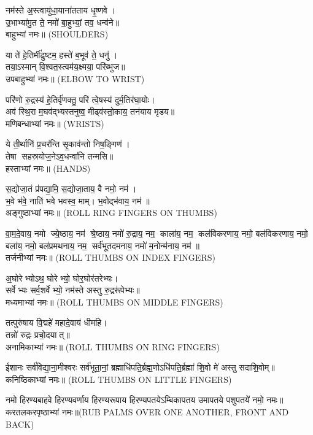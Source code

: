 नम॑स्ते अ॒स्त्वायु॑धा॒याना॑तताय धृ॒ष्णवे।\\
 उ॒भाभ्या॑मु॒त ते॒ नमो॑ बा॒हुभ्यां॒ तव॒ धन्व॑ने॥\\
बाहुभ्यां नमः॥ {\scriptsize (SHOULDERS)}


 या ते॑ हे॒तिर्मी॑ढुष्टम॒ हस्ते॑ ब॒भूव॑ ते॒ धनु॑।\\
 तया॒ऽस्मान् वि॒श्वत॒स्त्वम॑य॒क्ष्मया॒ परि॑ब्भुज॥\\
उपबाहुभ्यां नमः॥ {\scriptsize (ELBOW TO WRIST)}

परि॑णो रु॒द्रस्य॑ हे॒तिर्वृ॑णक्तु॒ परि॑ त्वे॒षस्य॑ दुर्म॒तिर॑घा॒योः।\\
 अव॑ स्थि॒रा म॒घव॑द्भ्यस्तनुष्व॒ मीढ्व॑स्तो॒काय॒ तन॑याय मृडय॥\\
मणिबन्धाभ्यां नमः॥ {\scriptsize (WRISTS)}

 ये ती॒र्थानि॑ प्र॒चर॑न्ति सृ॒काव॑न्तो निष॒ङ्गिण॑।\\
 तेषा सहस्रयोज॒नेऽव॒धन्वा॑नि तन्मसि॥\\
हस्ताभ्यां नमः॥ {\scriptsize (HANDS)}


स॒द्योजा॒तं प्र॑पद्या॒मि॒ स॒द्योजा॒ताय॒ वै नमो॒ नम॑।\\
भ॒वे भ॑वे॒ नाति॑ भवे भवस्व॒ माम्। भ॒वोद्भ॑वाय॒ नम॑॥ \\
अङ्गुष्ठाभ्यां नमः॥ {\scriptsize (ROLL RING FINGERS ON THUMBS)}

वा॒म॒दे॒वाय॒ नमो ज्ये॒ष्ठाय॒ नम॑ श्रे॒ष्ठाय॒ नमो॑ रु॒द्राय॒ नम॒ काला॑य॒ नम॒ कल॑विकरणाय॒ नमो॒ बल॑विकरणाय॒ नमो॒ बला॑य॒ नमो॒ बल॑प्रमथनाय॒ नम॒ सर्व॑भूतदमनाय॒ नमो॑ म॒नोन्म॑नाय॒ नम॑॥\\
तर्जनीभ्यां नमः॥ {\scriptsize (ROLL THUMBS ON INDEX FINGERS)}

अ॒घोरेभ्योऽथ॒ घोरेभ्यो॒ घोर॒घोर॑तरेभ्यः।\\
सर्वेभ्यः सर्व॒शर्वेभ्यो॒ नम॑स्ते अस्तु रु॒द्ररू॑पेभ्यः॥\\
मध्यमाभ्यां नमः॥ {\scriptsize (ROLL THUMBS ON MIDDLE FINGERS)}

तत्पुरु॑षाय वि॒द्महे॑ महादे॒वाय॑ धीमहि।\\
तन्नो॑ रुद्रः प्रचो॒दयात्॥\\
अनामिकाभ्यां नमः॥ {\scriptsize (ROLL THUMBS ON RING FINGERS)}

ईशानः सर्व॑विद्या॒ना॒मीश्वरः सर्व॑भूता॒नां॒ ब्रह्माधि॑पति॒र्ब्रह्म॒णो\-ऽधि॑पति॒र्ब्रह्मा॑ शि॒वो मे॑ अस्तु सदाशि॒वोम्॥\\
कनिष्ठिकाभ्यां नमः॥ {\scriptsize (ROLL THUMBS ON LITTLE FINGERS)}

नमो हिरण्यबाहवे हिरण्यवर्णाय हिरण्यरूपाय हिरण्यपतये\-ऽम्बिकापतय उमापतये पशुपतये॑ नमो॒ नमः॥\\
करतलकरपृष्ठाभ्यां नमः॥{\scriptsize (RUB PALMS OVER ONE ANOTHER, FRONT AND BACK)}

